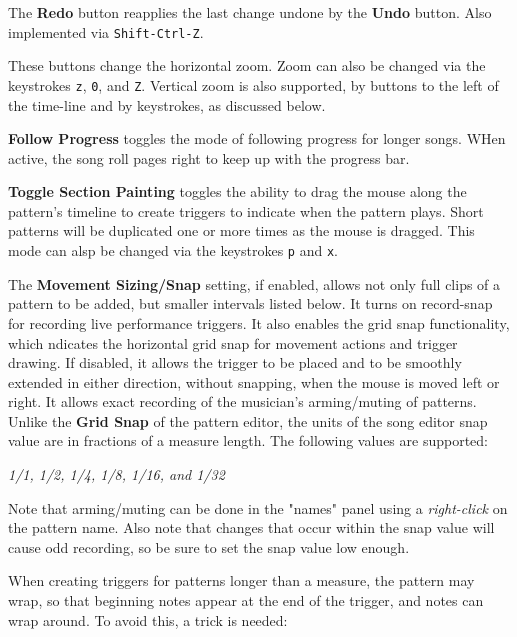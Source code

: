    The \textbf{Redo} button reapplies the last change undone by
   the \textbf{Undo} button.
   Also implemented via \texttt{Shift-Ctrl-Z}.

   These buttons change the horizontal zoom.
   Zoom can also be changed via the keystrokes \texttt{z}, \texttt{0},
   and \texttt{Z}.
   Vertical zoom is also supported, by buttons to the left of the time-line and
   by keystrokes, as discussed below.

   \textbf{Follow Progress} toggles the mode of following progress
   for longer songs.  WHen active, the song roll pages right to keep up with
   the progress bar.

   \textbf{Toggle Section Painting} toggles the ability
   to drag the mouse along the pattern's timeline to create triggers
   to indicate when the pattern plays.
   Short patterns will be duplicated one or more times as
   the mouse is dragged.
   This mode can alsp be changed via the keystrokes \texttt{p} and
   \texttt{x}.

   The \textbf{Movement Sizing/Snap} setting,
   if enabled, allows not only full clips of a pattern to be added,
   but smaller intervals listed below.
   It turns on record-snap for recording live performance triggers.
   It also enables the grid snap functionality,
   which ndicates the horizontal grid snap for movement actions and trigger
   drawing.
   If disabled, it allows the trigger to be placed and to be smoothly extended
   in either direction, without snapping, when the mouse is moved left or
   right. It allows exact recording of the musician's arming/muting of
   patterns.
   Unlike the \textbf{Grid Snap} of the pattern editor, the units
   of the song editor snap value are in fractions of a measure length.
   The following values are supported:

   \textsl{1/1, 1/2, 1/4, 1/8, 1/16, and 1/32}

   Note that arming/muting can be done in the "names" panel using a
   \textsl{right-click} on the pattern name.
   Also note that changes that occur within the snap value will 
   cause odd recording, so be sure to set the snap value low enough.

   When creating triggers for patterns longer than a measure,
   the pattern may wrap, so that beginning notes appear at the end of the
   trigger, and notes can wrap around.
   To avoid this, a trick is needed:

